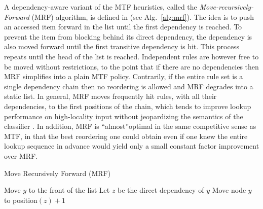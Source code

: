 


A dependency-aware variant of the MTF heuristics, called the \emph{Move-recursively-Forward} (MRF) algorithm, is defined in \cite{10228937} (see Alg.~\ref{alg:mrf}). The idea is to push an accessed item forward in the list until the first dependency is reached. To prevent the item from blocking behind its direct dependency, the dependency is also moved forward until the first transitive dependency is hit. This process repeats until the head of the list is reached.  Independent rules are however free to be moved without restrictions, to the point that if there are no dependencies then MRF simplifies into a plain MTF policy.  Contrarily, if the entire rule set is a single dependency chain then no reordering is allowed and MRF degrades into a static list. In general, MRF moves frequently hit rules, with all their dependencies, to the first positions of the chain, which tends to improve lookup performance on high-locality input without jeopardizing the semantics of the classifier \cite{10228937}. In addition, MRF is ``almost''optimal in the same competitive sense as MTF, in that the best reordering one could obtain even if one knew the entire lookup sequence in advance would yield only a small constant factor improvement over MRF.

\begin{algorithm}[t]
  \caption{Move Recursively Forward (MRF)}
  \label{alg:mrf}
  \begin{small}
    \begin{algorithmic}[1]
      \State Move $y$ to the front of the list
      \Else
      \State Let $z$ be the direct dependency of $y$
      \State Move node $y$ to position$(z) + 1$
      \State {}
      \EndIf
      \EndProcedure
    \end{algorithmic}
  \end{small}
\end{algorithm}

